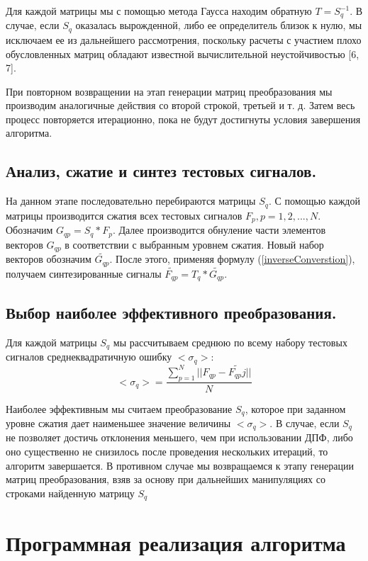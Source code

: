 \documentclass[11pt, oneside, a4paper]{article}
\begin{document}
Для каждой матрицы мы с помощью метода Гаусса находим обратную $T=S_q^{-1}$. В случае, если $S_q$ оказалась вырожденной, либо ее определитель близок к нулю, мы исключаем ее из дальнейшего рассмотрения, поскольку расчеты с участием плохо обусловленных матриц обладают известной вычислительной неустойчивостью [6, 7].

При повторном возвращении на этап генерации матриц преобразования мы производим аналогичные действия со второй строкой, третьей и т. д. Затем весь процесс повторяется итерационно, пока не будут достигнуты условия завершения алгоритма. 

\subsection{Анализ, сжатие и синтез тестовых сигналов.}

На данном этапе последовательно перебираются матрицы $S_q$. С помощью каждой матрицы производится сжатия всех тестовых сигналов $F_p, p=1,2,...,N$. Обозначим $G_{qp}=S_q*F_p$. Далее производится обнуление части элементов векторов $G_{qp}$ в соответствии с выбранным уровнем сжатия. Новый набор векторов обозначим $\tilde{G_{qp}}$. После этого, применяя формулу (\ref{inverseConverstion}), получаем синтезированные сигналы $\tilde{F_{qp}}=T_q*\tilde{G_{qp}}$.

\subsection{Выбор наиболее эффективного преобразования.}

Для каждой матрицы $S_q$ мы рассчитываем среднюю по всему набору тестовых сигналов среднеквадратичную ошибку $<\sigma_q>$:
\begin{equation}
\label{squareNormQ}
    <\sigma_q> = \frac{\sum\limits_{p=1}^{N}||F_{qp}-\tilde{F_{qp}j}||}{N}
\end{equation}

Наиболее эффективным мы считаем преобразование $S_q$, которое при заданном уровне сжатия дает наименьшее значение величины $<\sigma_q>$. В случае, если $S_q$ не позволяет достичь отклонения  меньшего, чем при использовании ДПФ, либо оно существенно не снизилось после проведения нескольких итераций, то алгоритм завершается. В противном случае мы возвращаемся к этапу генерации матриц преобразования, взяв за основу при дальнейших манипуляциях со строками найденную матрицу $S_q$

\section{Программная реализация алгоритма}
\end{document}

